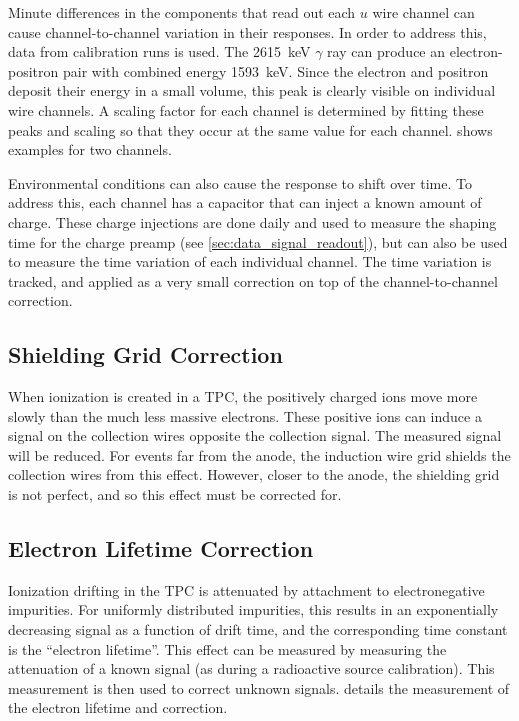 \documentclass[herrin-thesis.tex]{subfiles}
\begin{document}
Minute differences in the components that read out each \(u\) wire channel can cause channel-to-channel variation in their responses. In order to address this, data from  calibration runs is used. The \SI{2615}{\keV} \(\gamma\) ray can produce an electron-positron pair with combined energy \SI{1593}{\keV}. Since the electron and positron deposit their energy in a small volume, this peak is clearly visible on individual wire channels. A scaling factor for each channel is determined by fitting these peaks and scaling so that they occur at the same value for each channel.  shows examples for two channels.

Environmental conditions can also cause the response to shift over time. To address this, each channel has a capacitor that can inject a known amount of charge. These charge injections are done \about{} daily and used to measure the shaping time for the charge preamp (see \cref{sec:data_signal_readout}), but can also be used to measure the time variation of each individual channel. The time variation is tracked, and applied as a very small correction on top of the channel-to-channel correction.

\subsection{Shielding Grid Correction}
When ionization is created in a TPC, the positively charged ions move more slowly than the much less massive electrons. These positive ions can induce a signal on the collection wires opposite the collection signal. The measured signal will be reduced. For events far from the anode, the induction wire grid shields the collection wires from this effect. However, closer to the anode, the shielding grid is not perfect\cite{Bunemann:1949kx}, and so this effect must be corrected for.

\subsection{Electron Lifetime Correction}
Ionization drifting in the TPC is attenuated by attachment to electronegative impurities. For uniformly distributed impurities, this results in an exponentially decreasing signal as a function of drift time, and the corresponding time constant is the ``electron lifetime''. This effect can be measured by measuring the attenuation of a known signal (as during a radioactive source calibration). This measurement is then used to correct unknown signals.  details the measurement of the electron lifetime and correction.
\end{document}

